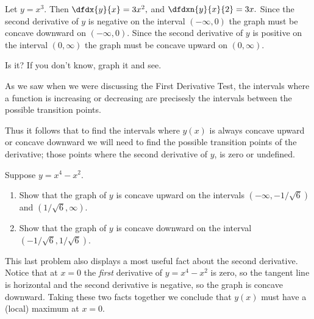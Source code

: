 \begin{myexample}
  Let $y=x^3.$ Then $\dfdx{y}{x}=3x^2,$ and $\dfdxn{y}{x}{2}=3x.$ Since
  the second derivative of $y$ is negative on the interval
  $(-\infty,0)$ the graph
  must be concave downward on $(-\infty, 0)$. Since the second derivative of $y$ is
  positive on the interval $(0,\infty)$ the graph must be concave upward
  on $(0,\infty)$.

  \begin{ProficiencyDrill}
    Is it? If you don't know, graph it and see.
  \end{ProficiencyDrill}
\end{myexample}

As we saw when we were discussing the First Derivative Test, 
the intervals where a function is increasing or decreasing  are
precisesly the intervals between the possible transition points.

Thus it follows that to find the intervals where $y(x)$ is
always concave upward or concave downward we will need to find the possible
transition points of the derivative; those points where the second
derivative of $y$, is zero or undefined. 

\begin{embeddedproblem}
  Suppose $y=x^4-x^2.$

  \begin{enumerate}[label={\bf{}(\alph*)}]
  \item Show that the graph of $y$ is concave upward  on the intervals
    $(-\infty,-1/\sqrt{6})$ and $(1/\sqrt{6},\infty)$.
  \item Show that the graph of $y$ is concave downward on  the interval
    $(-1/\sqrt{6},1/\sqrt{6})$.
  \end{enumerate}
\end{embeddedproblem}


This last problem also displays a most useful fact about the second
derivative. Notice that at $ x=0$ the \emph{first} derivative of
$y=x^4-x^2$ is zero, so the tangent line is horizontal and the second
derivative is negative, so the graph is concave downward.  Taking
these two facts together we conclude that $y(x)$ must have a (local)
maximum at $x=0.$

